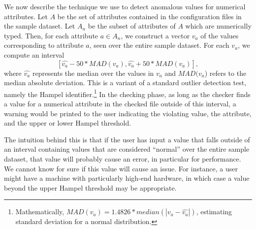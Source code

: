 We now describe the technique we use to detect anomalous values for 
numerical attributes. Let $A$ be the set of attributes contained in the 
configuration files in the sample dataset. 
Let $A_n$ be the subset of attributes of $A$ which are numerically typed. 
Then, for each attribute $a \in A_n$, we construct a vector $v_a$ of the 
values corresponding to attribute $a$, seen over the entire sample dataset.
For each $v_a$, we compute 
an interval  $$[\hat{v_a} - 50*MAD(v_a), \hat{v_a} + 50*MAD(v_a)],$$ 
where $\hat{v_a}$ represents the median over the values 
in $v_a$ and $MAD(v_a$) refers to the 
median absolute deviation. 
This is a variant of a standard outlier detection test, namely the Hampel identifier.\footnote{Mathematically, $MAD(v_a) = 1.4826* median(|v_a - \hat{v_a}|)$, estimating standard deviation 
for a normal distribution.} 
In the checking phase, as long as the checker finds a value for a numerical 
attribute in the checked file outside of this interval, 
a warning would be printed to the user indicating the violating value, 
the attribute, and the upper or lower Hampel threshold. 

The intuition behind this is that if the user has input a value 
that falls outside of an interval containing values that are considered 
``normal'' over the entire sample dataset, 
that value will probably cause an error, in particular for performance. 
We cannot know for sure if this value will cause an issue. 
For instance, a user might have a machine with 
particularly high-end hardware, 
in which case a value beyond the upper Hampel threshold may be appropriate. 

